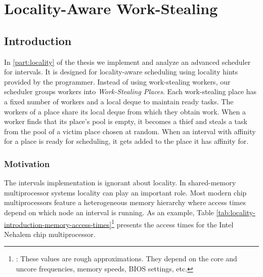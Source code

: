
\part{Locality-Aware Work-Stealing}
\label{part:locality}

\chapter{Introduction}
\label{chap:locality-introduction}

In \autoref{part:locality} of the thesis we implement and analyze an
advanced scheduler for intervals. It is designed for locality-aware
scheduling using locality hints provided by the programmer. Instead of
using work-stealing workers, our scheduler groups workers into
\emph{Work-Stealing Places}. Each work-stealing place has a fixed
number of workers and a local deque to maintain ready tasks. The
workers of a place share its local deque from which they obtain
work. When a worker finds that its place's pool is empty, it becomes a
thief and steals a task from the pool of a victim place chosen at
random. When an interval with affinity for a place is ready for
scheduling, it gets added to the place it has affinity for.

\section{Motivation}
\label{sec:locality-intro-motivation}

The intervals implementation is ignorant about locality. In
shared-memory multiprocessor systems locality can play an important
role. Most modern chip multiprocessors feature a heterogeneous memory
hierarchy where access times depend on which node an interval is
running. As an example, Table
\ref{tab:locality-introduction-memory-access-times}\footnote{\cite{Levinthal2009}:
  These values are rough approximations. They depend on the core and
  uncore frequencies, memory speeds, BIOS settings, etc.} presents the
access times for the Intel Nehalem chip multiprocessor.

